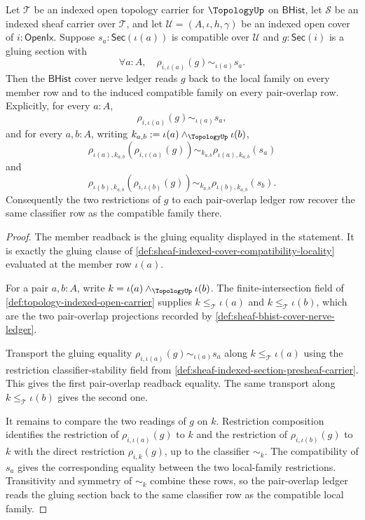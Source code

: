 \begin{theorem}
\label{thm:sheaf-bhist-cover-nerve-gluing-readback}
Let $\mathcal{T}$ be an indexed open topology carrier for $\TopologyUp$ on $\mathsf{BHist}$, let $\mathcal{S}$ be an indexed sheaf carrier over $\mathcal{T}$, and let $\mathcal{U}=(A,\iota,h,\gamma)$ be an indexed open cover of $i:\mathsf{OpenIx}$. Suppose $s_a:\mathsf{Sec}(\iota(a))$ is compatible over $\mathcal{U}$ and $g:\mathsf{Sec}(i)$ is a gluing section with
$$
\forall a:A,\quad \rho_{i,\iota(a)}(g)\sim_{\iota(a)}s_a.
$$
Then the $\mathsf{BHist}$ cover nerve ledger reads $g$ back to the local family on every member row and to the induced compatible family on every pair-overlap row. Explicitly, for every $a:A$,
$$
\rho_{i,\iota(a)}(g)\sim_{\iota(a)}s_a,
$$
and for every $a,b:A$, writing $k_{a,b}:=\iota(a)\wedge_{\TopologyUp}\iota(b)$,
$$
\rho_{\iota(a),k_{a,b}}(\rho_{i,\iota(a)}(g))
\sim_{k_{a,b}}
\rho_{\iota(a),k_{a,b}}(s_a)
$$
and
$$
\rho_{\iota(b),k_{a,b}}(\rho_{i,\iota(b)}(g))
\sim_{k_{a,b}}
\rho_{\iota(b),k_{a,b}}(s_b).
$$
Consequently the two restrictions of $g$ to each pair-overlap ledger row recover the same classifier row as the compatible family there.
\end{theorem}
\begin{proof}
The member readback is the gluing equality displayed in the statement. It is exactly the gluing clause of \autoref{def:sheaf-indexed-cover-compatibility-locality} evaluated at the member row $\iota(a)$.

For a pair $a,b:A$, write $k=\iota(a)\wedge_{\TopologyUp}\iota(b)$. The finite-intersection field of \autoref{def:topology-indexed-open-carrier} supplies $k\le_{\mathcal{T}}\iota(a)$ and $k\le_{\mathcal{T}}\iota(b)$, which are the two pair-overlap projections recorded by \autoref{def:sheaf-bhist-cover-nerve-ledger}.

Transport the gluing equality $\rho_{i,\iota(a)}(g)\sim_{\iota(a)}s_a$ along $k\le_{\mathcal{T}}\iota(a)$ using the restriction classifier-stability field from \autoref{def:sheaf-indexed-section-presheaf-carrier}. This gives the first pair-overlap readback equality. The same transport along $k\le_{\mathcal{T}}\iota(b)$ gives the second one.

It remains to compare the two readings of $g$ on $k$. Restriction composition identifies the restriction of $\rho_{i,\iota(a)}(g)$ to $k$ and the restriction of $\rho_{i,\iota(b)}(g)$ to $k$ with the direct restriction $\rho_{i,k}(g)$, up to the classifier $\sim_k$. The compatibility of $s_a$ gives the corresponding equality between the two local-family restrictions. Transitivity and symmetry of $\sim_k$ combine these rows, so the pair-overlap ledger reads the gluing section back to the same classifier row as the compatible local family.
\end{proof}


